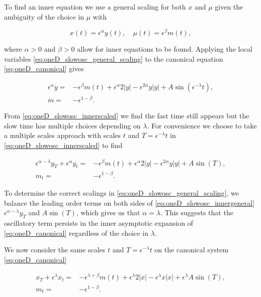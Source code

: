 \indent To find an inner equation we use a general scaling for both $x$ and $\mu$ given the ambiguity of the choice in $\mu$ with

\begin{equation}\label{eq:oneD_slowosc_general_scaling}
x(t)=\epsilon^\alpha y(t) ,\quad \mu(t)=\epsilon^\beta m(t),
\end{equation}

where $\alpha>0$ and $\beta>0$ allow for inner equations to be found. Applying the local variables \eqref{eq:oneD_slowosc_general_scaling} to the canonical equation \eqref{eq:oneD_canonical} gives

\begin{equation}\label{eq:oneD_slowosc_innerscaled}
\begin{aligned}
\epsilon^\alpha \dot{y}=& -\epsilon^\beta m(t)+\epsilon^\alpha 2|y| - \epsilon^{2\alpha}y|y| +A\sin(\epsilon^{-\lambda}t),\\
\dot{m}=&-\epsilon^{1-\beta}.
\end{aligned}
\end{equation}

From \eqref{eq:oneD_slowosc_innerscaled} we find the fast time still appears but the slow time has multiple choices depending on $\lambda$. For convenience we choose to take a multiple scales approach with scales $t$ and $T=\epsilon^{-\lambda}t$ in \eqref{eq:oneD_slowosc_innerscaled} to find

\begin{equation}\label{eq:oneD_slowosc_innergeneral}
\begin{aligned}
\epsilon^{\alpha-\lambda} y_T+\epsilon^{\alpha}y_t=& -\epsilon^{\beta}m(t)+\epsilon^{\alpha}2|y|-\epsilon^{2\alpha}y|y|+A\sin(T),\\
m_t=&-\epsilon^{1-\beta}.
\end{aligned}
\end{equation}

To determine the correct scalings in \eqref{eq:oneD_slowosc_general_scaling}, we balance the leading order terms on both sides of \eqref{eq:oneD_slowosc_innergeneral} $\epsilon^{\alpha-\lambda}y_T$ and $A\sin(T)$, which gives us that $\alpha=\lambda$. This suggests that the oscillatory term persists in the inner asymptotic expansion of \eqref{eq:oneD_canonical} regardless of the choice in $\lambda$.

\indent We now consider the same scales $t$ and $T=\epsilon^{-\lambda}t$ on the canonical system \eqref{eq:oneD_canonical} 

\begin{equation}\label{eq:oneD_slowosc_general_outermulti}
\begin{aligned}
x_T+\epsilon^{\lambda}x_t =& -\epsilon^{\lambda+\beta}m(t)+\epsilon^{\lambda}2|x|-\epsilon^{\lambda}x|x|+\epsilon^{\lambda}A\sin(T),\\
m_t =&-\epsilon^{1-\beta}.
\end{aligned}
\end{equation}

